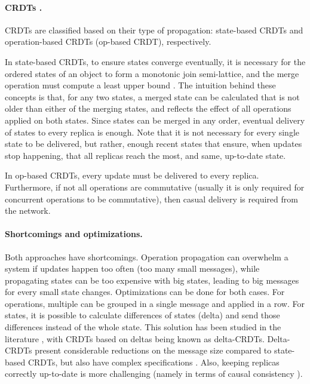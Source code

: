\paragraph{CRDTs \cite{crdt}.}
CRDTs are classified based on their type of propagation: state-based CRDTs and operation-based CRDTs (op-based CRDT), respectively.

In state-based CRDTs, to ensure states converge eventually, it is necessary for the ordered states of an object to form a monotonic join semi-lattice, and the merge operation must compute a least upper bound \cite{crdt, stateCRDT}. The intuition behind these concepts is that, for any two states, a merged state can be calculated that is not older than either of the merging states, and reflects the effect of all operations applied on both states.
Since states can be merged in any order, eventual delivery of states to every replica is enough.
Note that it is not necessary for every single state to be delivered, but rather, enough recent states that ensure, when updates stop happening, that all replicas reach the most, and same, up-to-date state.

In op-based CRDTs, every update must be delivered to every replica.
Furthermore, if not all operations are commutative (usually it is only required for concurrent operations to be commutative), then casual delivery is required from the network.

\paragraph{Shortcomings and optimizations.}
Both approaches have shortcomings.
Operation propagation can overwhelm a system if updates happen too often (too many small messages), while propagating states can be too expensive with big states, leading to big messages for every small state changes.
Optimizations can be done for both cases.
For operations, multiple can be grouped in a single message and applied in a row.
For states, it is possible to calculate differences of states (delta) and send those differences instead of the whole state.
This solution has been studied in the literature \cite{deltaAlmeida, deltaVan}, with CRDTs based on deltas being known as delta-CRDTs. Delta-CRDTs present considerable reductions on the message size compared to state-based CRDTs, but also have complex specifications \cite{deltaAlmeida}. Also, keeping replicas correctly up-to-date is more challenging (namely in terms of causal consistency \cite{deltaAlmeida}).

